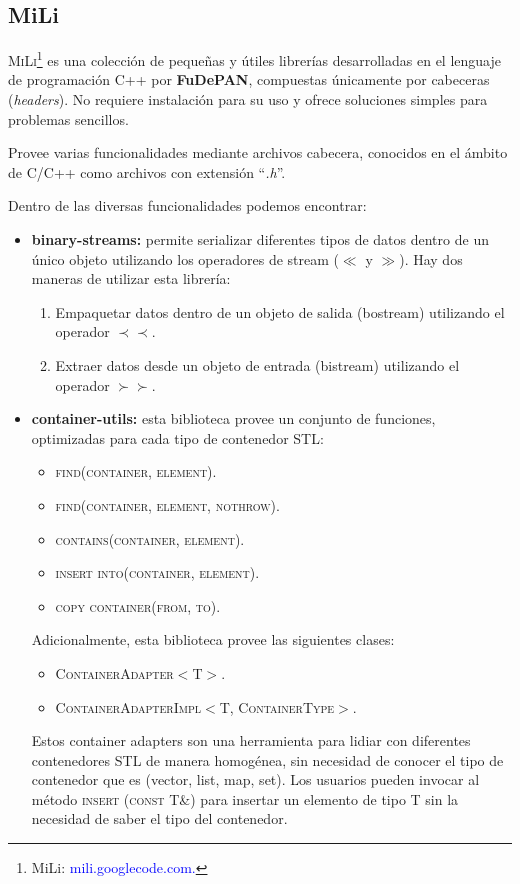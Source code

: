 \documentclass[12pt,a4paper,spanish]{article}
\begin{document}
	\subsection{MiLi}
		\par \textsc{MiLi}\footnote{MiLi: \textcolor{blue}{mili.googlecode.com.}} es una colección de pequeñas y útiles librerías desarrolladas en el 			lenguaje de programación \textsc{C++} por \textbf{FuDePAN}, compuestas únicamente por cabeceras (\textit{headers}). No requiere instalación para 			su uso y ofrece soluciones simples para problemas sencillos.
		\par Provee varias funcionalidades mediante archivos cabecera, conocidos en el ámbito de C/C++ como archivos con extensión ``\textit{.h}''. 
		\par Dentro de las diversas funcionalidades podemos encontrar:
		\begin{itemize}
			\item \textbf{binary-streams:} permite serializar diferentes tipos de datos dentro de un único objeto utilizando los operadores de stream 											  ($\ll$ y $\gg$). Hay dos maneras de utilizar esta librería:
											\begin{enumerate}
												\item Empaquetar datos dentro de un objeto de salida (bostream) utilizando el operador $\prec \prec$.	
												\item Extraer datos desde un objeto de entrada (bistream) utilizando el operador $\succ \succ$.
											\end{enumerate}
			\item \textbf{container-utils:} esta biblioteca provee un conjunto de funciones, optimizadas para cada tipo de contenedor STL:
							\begin{itemize}
								\item \textsc{find(container, element)}.
								\item \textsc{find(container, element, nothrow)}.
								\item \textsc{contains(container, element)}.
								\item \textsc{insert into(container, element)}.
								\item \textsc{copy container(from, to)}.
							\end{itemize}
							\par Adicionalmente, esta biblioteca provee las siguientes clases:
							\begin{itemize}
								\item \textsc{ContainerAdapter$<$T$>$}.
								\item \textsc{ContainerAdapterImpl$<$T, ContainerType$>$}.
							\end{itemize}
						\par Estos container adapters son una herramienta para lidiar con diferentes contenedores \textsc{STL} de manera homogénea, sin 						necesidad de conocer el tipo de contenedor que es (vector, list, map, set). Los usuarios pueden invocar al método 							\textsc{insert (const T\&)} para insertar un elemento de tipo \textsc{T} sin la necesidad de saber el tipo del contenedor.


\end{itemize}
\end{document}
